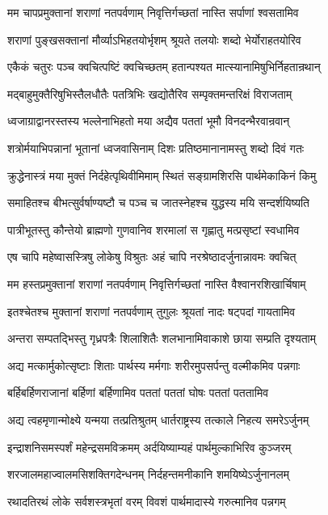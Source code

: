 \twolineshloka
{मम चापप्रमुक्तानां शराणां नतपर्वणाम्}
{निवृत्तिर्गच्छतां नास्ति सर्पाणां श्वसतामिव}


\twolineshloka
{शराणां पुङ्खसक्तानां मौर्व्याऽभिहतयोर्भृशम्}
{श्रूयते तलयोः शब्दो भेर्योराहतयोरिव}


\twolineshloka
{एकैकं चतुरः पञ्च क्वचित्पष्टिं क्वचिच्छतम्}
{हतान्पश्यत मात्स्यानामिषुभिर्निहतान्रथान्}


\twolineshloka
{मद्बाहुमुक्तैरिषुभिस्तैलधौतैः पतत्रिभिः}
{खद्योतैरिव सम्पृक्तमन्तरिक्षं विराजताम्}


\twolineshloka
{ध्वजाग्राद्वानरस्तस्य भल्लेनाभिहतो मया}
{अद्यैव पततां भूमौ विनदन्भैरवान्रवान्}


\twolineshloka
{शत्रोर्मयाभिपन्नानां भूतानां ध्वजवासिनाम्}
{दिशः प्रतिष्ठमानानामस्तु शब्दो दिवं गतः}


\twolineshloka
{क्रुद्धेनास्त्रं मया मुक्तं निर्दहेत्पृथिवीमिमाम्}
{स्थितं सङ्ग्रामशिरसि पार्थमेकाकिनं किमु}


\twolineshloka
{समाहितश्च बीभत्सुर्वर्षाण्यष्टौ च पञ्च च}
{जातस्नेहश्च युद्धस्य मयि सन्दर्शयिष्यति}


\twolineshloka
{पात्रीभूतस्तु कौन्तेयो ब्राह्मणो गुणवानिव}
{शरमालां स गृह्णातु मत्प्रसृष्टां स्वधामिव}


\twolineshloka
{एष चापि महेष्वासस्त्रिषु लोकेषु विश्रुतः}
{अहं चापि नरश्रेष्ठादर्जुनान्नावमः क्वचित्}


\twolineshloka
{मम हस्तप्रमुक्तानां शराणां नतपर्वणाम्}
{निवृत्तिर्गच्छतां नास्ति वैश्वानरशिखार्चिषाम्}


\twolineshloka
{इतश्चेतश्च मुक्तानां शराणां नतपर्वणाम्}
{तुगुलः श्रूयतां नादः षट्पदां गायतामिव}


\twolineshloka
{अन्तरा सम्पतद्भिस्तु गृध्रपत्रैः शिलाशितैः}
{शलभानामिवाकाशे छाया सम्प्रति दृश्यताम्}


\twolineshloka
{अद्य मत्कार्मुकोत्सृष्टाः शिताः पार्थस्य मर्मगाः}
{शरीरमुपसर्पन्तु वल्मीकमिव पन्नगाः}


\twolineshloka
{बर्हिबर्हिणराजानां बर्हिणां बर्हिणामिव}
{पततां पततां घोषः पततां पततामिव}


\twolineshloka
{अद्य त्वहमृणान्मोक्ष्ये यन्मया तत्प्रतिश्रुतम्}
{धार्तराष्ट्रस्य तत्काले निहत्य समरेऽर्जुनम्}


\twolineshloka
{इन्द्राशनिसमस्पर्शं महेन्द्रसमविक्रमम्}
{अर्दयिष्याम्यहं पार्थमुल्काभिरिव कुञ्जरम्}


\twolineshloka
{शरजालमहाज्वालमसिशक्तिगदेन्धनम्}
{निर्दहन्तमनीकानि शमयिष्येऽर्जुनानलम्}


\twolineshloka
{रथादतिरथं लोके सर्वशस्त्रभृतां वरम्}
{विवशं पार्थमादास्ये गरुत्मानिव पन्नगम्}


